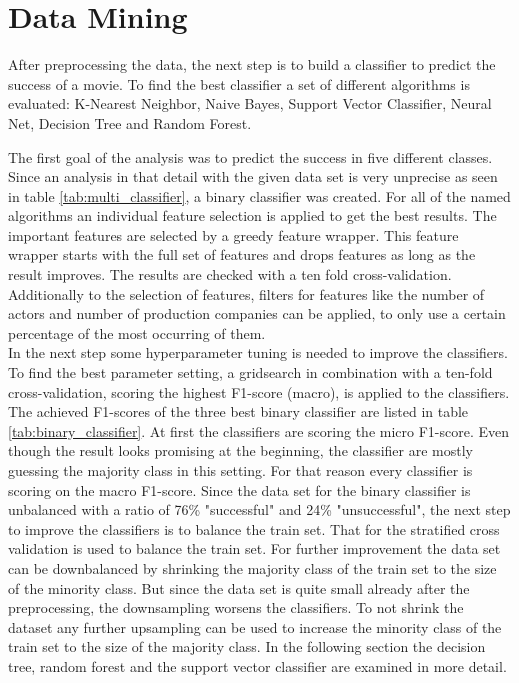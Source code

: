 \chapter{Data Mining}
\label{cha:data_mining}

After preprocessing the data, the next step is to build a classifier to predict the success of a movie. To find the best classifier a set of different algorithms is evaluated:
K-Nearest Neighbor, 
Naive Bayes, 
Support Vector Classifier, 
Neural Net, 
Decision Tree and 
Random Forest.

The first goal of the analysis was to predict the success in five different classes. Since an analysis in that detail with the given data set is very unprecise as seen in table \ref{tab:multi_classifier}, a binary classifier was created.
For all of the named algorithms an individual feature selection is applied to get the best results. The important features are selected by a greedy feature wrapper. This feature wrapper starts with the full set of features and drops features as long as the result improves. The results are checked with a ten fold cross-validation. Additionally to the selection of features, filters for features like the number of actors and number of production companies can be applied, to only use a certain percentage of the most occurring of them. \\
In the next step some hyperparameter tuning is needed to improve the classifiers. To find the best parameter setting, a gridsearch in combination with a ten-fold cross-validation, scoring the highest F1-score (macro), is applied to the classifiers.
The achieved F1-scores of the three best binary classifier are listed in table \ref{tab:binary_classifier}. 
At first the classifiers are scoring the micro F1-score. Even though the result looks promising at the beginning, the classifier are mostly guessing the majority class in this setting. For that reason every classifier is scoring on the macro F1-score. Since the data set for the binary classifier is unbalanced with a ratio of 76\% "successful" and 24\% "unsuccessful", the next step to improve the classifiers is to balance the train set. That for the stratified cross validation is used to balance the train set. For further improvement the data set can be downbalanced by shrinking the majority class of the train set to the size of the minority class. But since the data set is quite small already after the preprocessing, the downsampling worsens the classifiers. To not shrink the dataset any further upsampling can be used to increase the minority class of the train set to the size of the majority class. In the following section the decision tree, random forest and the support vector classifier are examined in more detail.

